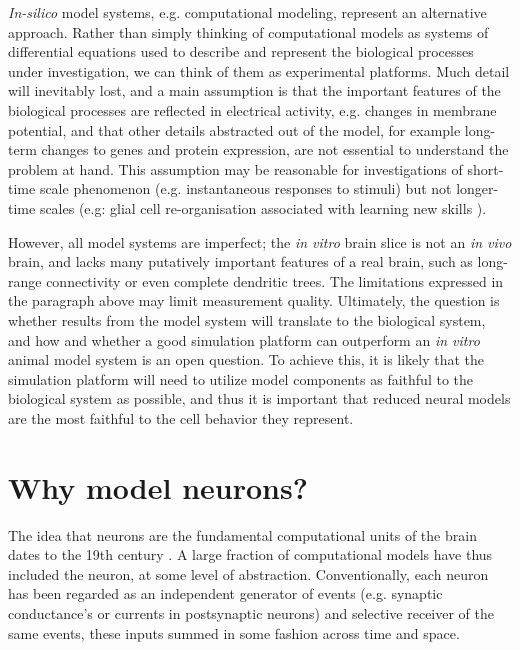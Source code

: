 \emph{In-silico} model systems, e.g. computational modeling, represent an alternative approach.
Rather than simply thinking of computational models as systems of differential equations used to describe and represent the biological processes under investigation, we can think of them as experimental platforms.
Much detail will inevitably lost, and a main assumption is that the important features of the biological processes are reflected in electrical activity, e.g. changes in membrane potential, and that other details abstracted out of the model, for example long-term changes to genes and protein expression, are not essential to understand the problem at hand.
This assumption may be reasonable for investigations of short-time scale phenomenon (e.g. instantaneous responses to stimuli) but not longer-time scales (e.g: glial cell re-organisation associated with learning new skills \citep{draganski2008training}).

However, all model systems are imperfect; the \emph{in vitro} brain slice is not an \emph{in vivo} brain, and lacks many putatively important features of a real brain, such as long-range connectivity or even complete dendritic trees.
The limitations expressed in the paragraph above may limit measurement quality.
Ultimately, the question is whether results from the model system will translate to the biological system, and how and whether a good simulation platform can outperform an \emph{in vitro} animal model system is an open question.
To achieve this, it is likely that the simulation platform will need to utilize model components as faithful to the biological system as possible, and thus it is important that reduced neural models are the most faithful to the cell behavior they represent. 

\section{Why model neurons?}
The idea that neurons are the fundamental computational units of the brain dates to the 19th century \citep{shepherd2015foundations,jones1999golgi}.
A large fraction of computational models have thus included the neuron, at some level of abstraction.  
Conventionally, each neuron has been regarded as an independent generator of events (e.g. synaptic conductance's or currents in postsynaptic neurons) and selective receiver of the same events, these inputs summed in some fashion across time and space. 

